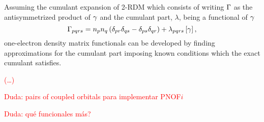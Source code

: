 
Assuming the cumulant expansion of 2-RDM which
consists of writing $\Gamma$ as the antisymmetrized product of $\gamma$ and
the cumulant part, $\lambda$, being a functional of $\gamma$ 
\begin{equation}
    \Gamma_{pqrs} =
    n_p n_q \left( \delta_{pr} \delta_{qs} - \delta_{ps} \delta_{qr} \right)
    + \lambda_{pqrs} \left[ \gamma \right]
    ,
\end{equation}
one-electron density matrix functionals can be developed by finding
approximations for the cumulant part imposing known conditions which the exact
cumulant satisfies.

\textcolor{red}{(\ldots)}

\textcolor{red}{Duda: pairs of coupled orbitals para implementar PNOF$i$}

\textcolor{red}{Duda: qué funcionales más?}

%

